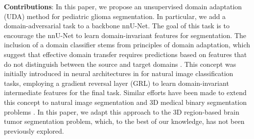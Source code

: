 \documentclass[runningheads]{llncs}
\begin{document}
\textbf{Contributions}: In this paper, we propose an unsupervised domain adaptation (UDA) method for pediatric glioma segmentation. In particular, we add a domain-adversarial task to a backbone nnU-Net. The goal of this task is to encourage the nnU-Net to learn domain-invariant features for segmentation. The inclusion of a domain classifier stems from principles of domain adaptation, which suggest that effective domain transfer requires predictions based on features that do not distinguish between the source and target domains \cite{ben2006analysis}. This concept was initially introduced in neural architectures in \cite{ganin2016domain} for natural image classification tasks, employing a gradient reversal layer (GRL) to learn domain-invariant intermediate features for the final task. Similar efforts have been made to extend this concept to natural image segmentation \cite{bolte2019unsupervised} and 3D medical binary segmentation problems \cite{kamnitsas2017unsupervised}. In this paper, we adapt this approach to the 3D region-based brain tumor segmentation problem, which, to the best of our knowledge, has not been previously explored.









\end{document}
